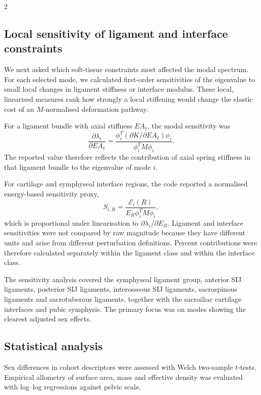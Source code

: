 \documentclass[openacc]{rsproca_new}
\begin{document}
\begin{multicols}{2}
\subsection{Local sensitivity of ligament and interface constraints}

We next asked which soft-tissue constraints most affected the modal spectrum. For each selected mode, we calculated first-order sensitivities of the eigenvalue to small local changes in ligament stiffness or interface modulus. These local, linearised measures rank how strongly a local stiffening would change the elastic cost of an $M$-normalised deformation pathway.

For a ligament bundle with axial stiffness $EA_{\ell}$, the modal sensitivity was
\[
\frac{\partial \lambda_i}{\partial EA_{\ell}} =
\frac{\phi_i^{T}(\partial K/\partial EA_{\ell})\phi_i}
{\phi_i^{T}M\phi_i}.
\]
The reported value therefore reflects the contribution of axial spring stiffness in that ligament bundle to the eigenvalue of mode $i$.

For cartilage and symphyseal interface regions, the code reported a normalised energy-based sensitivity proxy,
\[
S_{i,R} =
\frac{\mathcal{E}_{i}(R)}
{E_R \phi_i^{T}M\phi_i},
\]
which is proportional under linearisation to $\partial \lambda_i/\partial E_R$. Ligament and interface sensitivities were not compared by raw magnitude because they have different units and arise from different perturbation definitions. Percent contributions were therefore calculated separately within the ligament class and within the interface class.

The sensitivity analysis covered the symphyseal ligament group, anterior SIJ ligaments, posterior SIJ ligaments, interosseous SIJ ligaments, sacrospinous ligaments and sacrotuberous ligaments, together with the sacroiliac cartilage interfaces and pubic symphysis. The primary focus was on modes showing the clearest adjusted sex effects.

\subsection{Statistical analysis}

Sex differences in cohort descriptors were assessed with Welch two-sample $t$-tests. Empirical allometry of surface area, mass and effective density was evaluated with log--log regressions against pelvic scale.


\end{multicols}
\end{document}
